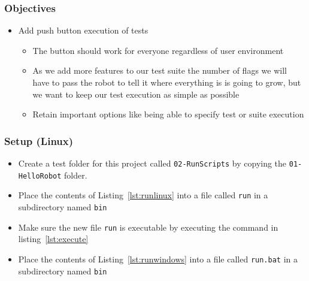 \documentclass[xcolor=table,handout]{beamer}
\begin{document}
\begin{frame}[fragile]\frametitle{Objectives}
    \begin{itemize}
        \item Add push button execution of tests
            \begin{itemize}
                \item The button should work for everyone regardless of user environment
                \item As we add more features to our test suite the number of flags we will have to pass the robot to tell it where everything is is going to grow, but we want to keep our test execution as simple as possible
                \item Retain important options like being able to specify test or suite execution
            \end{itemize}
    \end{itemize}
\end{frame}

\begin{frame}[fragile]\frametitle{Setup (Linux)}
    \begin{itemize}
        \item Create a test folder for this project called \texttt{02-RunScripts} by copying the \texttt{01-HelloRobot} folder.
        \item Place the contents of Listing~\ref{lst:runlinux} into a file called \texttt{run} in a subdirectory named \texttt{bin}
        \item Make sure the new file \texttt{run} is executable by executing the command in listing~\ref{lst:execute}
        \item Place the contents of Listing~\ref{lst:runwindows} into a file called \texttt{run.bat} in a subdirectory named \texttt{bin}
    \end{itemize}
\end{frame}
\end{document}
